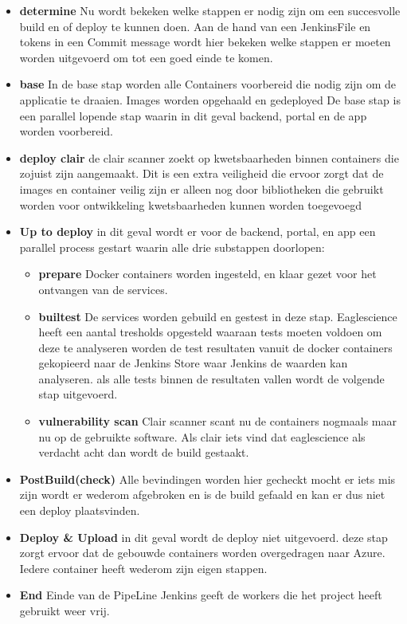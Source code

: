 \begin{itemize}
\item \textbf{determine} Nu wordt bekeken welke stappen er nodig zijn om een succesvolle build en of deploy te kunnen doen. Aan de hand van een JenkinsFile en tokens in een Commit message wordt hier bekeken welke stappen er moeten worden uitgevoerd om tot een goed einde te komen.
\item \textbf{base} In de base stap worden alle Containers voorbereid die nodig zijn om de applicatie te draaien. Images worden opgehaald en gedeployed De base stap is een parallel lopende stap waarin in dit geval backend, portal en de app worden voorbereid.
\item \textbf{deploy clair} de clair scanner zoekt op kwetsbaarheden binnen containers die zojuist zijn aangemaakt. Dit is een extra veiligheid die ervoor zorgt dat de images en container veilig zijn er alleen nog door bibliotheken die gebruikt worden voor ontwikkeling kwetsbaarheden kunnen worden toegevoegd
\item \textbf{Up to deploy}
in dit geval wordt er voor de backend, portal, en app een parallel process gestart waarin alle drie substappen doorlopen:
\begin{itemize}
\item \textbf{prepare} Docker containers worden ingesteld, en klaar gezet voor het ontvangen van de services.
\item \textbf{builtest} De services worden gebuild en gestest in deze stap. Eaglescience heeft een aantal tresholds opgesteld waaraan tests moeten voldoen om deze te analyseren worden de test resultaten vanuit de docker containers gekopieerd naar de Jenkins Store waar Jenkins de waarden kan analyseren. als alle tests binnen de resultaten vallen wordt de volgende stap uitgevoerd.
\item \textbf{vulnerability scan} Clair scanner scant nu de containers nogmaals maar nu op de gebruikte software. Als clair iets vind dat eaglescience als verdacht acht dan wordt de build gestaakt.
\end{itemize}
\item \textbf{PostBuild(check)}
Alle bevindingen worden hier gecheckt mocht er iets mis zijn wordt er wederom afgebroken en is de build gefaald en kan er dus niet een deploy plaatsvinden.
\item \textbf{Deploy \& Upload}
in dit geval wordt de deploy niet uitgevoerd. deze stap zorgt ervoor dat de gebouwde containers worden overgedragen naar Azure. Iedere container heeft wederom zijn eigen stappen.
\item \textbf{End}
Einde van de PipeLine Jenkins geeft de workers die het project heeft gebruikt weer vrij.
\end{itemize}
